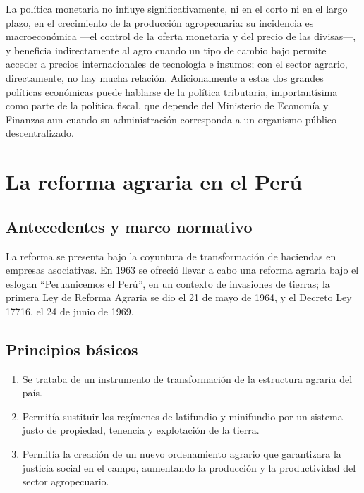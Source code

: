 \documentclass[
  man,
  floatsintext,
  longtable,
  a4paper,
  nolmodern,
  notxfonts,
  notimes,
  12pt,
  colorlinks=true,linkcolor=blue,citecolor=blue,urlcolor=blue]{apa7}
\begin{document}
La política monetaria no influye significativamente, ni en el corto ni
en el largo plazo, en el crecimiento de la producción agropecuaria: su
incidencia es macroeconómica ---el control de la oferta monetaria y del
precio de las divisas---, y beneficia indirectamente al agro cuando un
tipo de cambio bajo permite acceder a precios internacionales de
tecnología e insumos; con el sector agrario, directamente, no hay mucha
relación. Adicionalmente a estas dos grandes políticas económicas puede
hablarse de la política tributaria, importantísima como parte de la
política fiscal, que depende del Ministerio de Economía y Finanzas aun
cuando su administración corresponda a un organismo público
descentralizado.

\section{La reforma agraria en el
Perú}\label{la-reforma-agraria-en-el-peruxfa}

\subsection{Antecedentes y marco
normativo}\label{antecedentes-y-marco-normativo}

La reforma se presenta bajo la coyuntura de transformación de haciendas
en empresas asociativas. En 1963 se ofreció llevar a cabo una reforma
agraria bajo el eslogan ``Peruanicemos el Perú'', en un contexto de
invasiones de tierras; la primera Ley de Reforma Agraria se dio el 21 de
mayo de 1964, y el Decreto Ley 17716, el 24 de junio de 1969.

\subsection{Principios básicos}\label{principios-buxe1sicos}

\begin{enumerate}
\def\labelenumi{\arabic{enumi}.}
\item
  Se trataba de un instrumento de transformación de la estructura
  agraria del país.
\item
  Permitía sustituir los regímenes de latifundio y minifundio por un
  sistema justo de propiedad, tenencia y explotación de la tierra.
\item
  Permitía la creación de un nuevo ordenamiento agrario que garantizara
  la justicia social en el campo, aumentando la producción y la
  productividad del sector agropecuario.
\end{enumerate}
\end{document}
